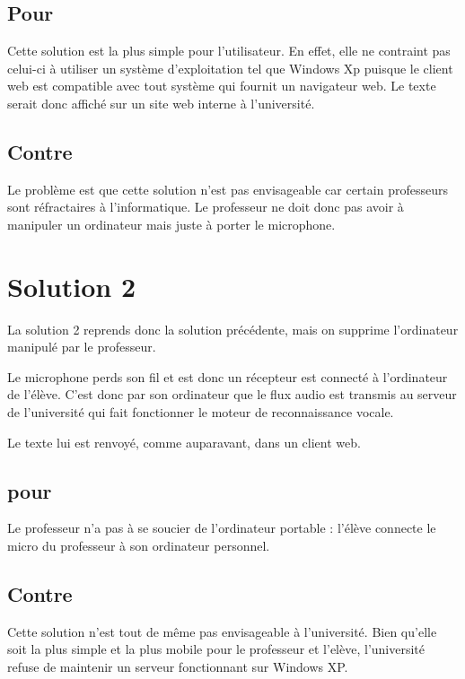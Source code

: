 \subsection{Pour}
Cette solution est la plus simple pour l'utilisateur. En effet, elle ne contraint pas celui-ci à utiliser un système d'exploitation tel que Windows Xp puisque le client web est compatible avec tout système qui fournit un navigateur web. Le texte serait donc affiché sur un site web interne à l'université.

\subsection{Contre}
Le problème est que cette solution n'est pas envisageable car certain professeurs sont ré\-frac\-tai\-res à l'informatique. Le professeur ne doit donc pas avoir à manipuler un ordinateur mais juste à porter le microphone.


\section{Solution 2}

La solution 2 reprends donc la solution précédente, mais on supprime l'ordinateur manipulé par le professeur.


Le microphone perds son fil et est donc un récepteur est connecté à l'ordinateur de l'élève.
C'est donc par son ordinateur que le flux audio est transmis au serveur de l'université qui fait fonctionner le moteur de reconnaissance vocale.

Le texte lui est renvoyé, comme auparavant, dans un client web.

\subsection{pour}
Le professeur n'a pas à se soucier de l'ordinateur portable : l'élève connecte le micro du professeur à son ordinateur personnel.

\subsection{Contre}
Cette solution n'est tout de même pas envisageable à l'université. Bien qu'elle soit la plus simple et la plus mobile pour le professeur et l'elève, l'université refuse de maintenir un serveur fonctionnant sur Windows XP.

